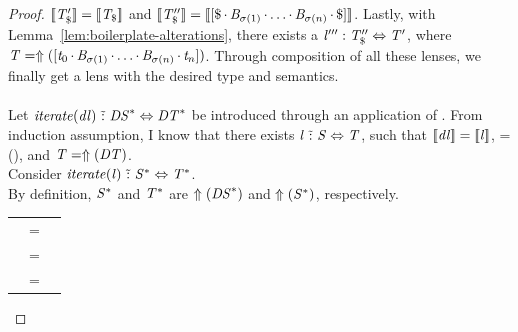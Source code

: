 \documentclass[acmsmall]{acmart}
\begin{document}
\begin{lemma}
\begin{proof}
    $[ \! [\mathit{T}_{\$}'] \! ]=[ \! [\mathit{T}_{\$}] \! ]$ and 
    $[ \! [\mathit{T}_{\$}''] \! ]=[ \! [[\$ \mkern-1mu\cdot\mkern-1mu  \mathit{B}_{\sigma(1)}  \mkern-1mu\cdot\mkern-1mu  \ldots  \mkern-1mu\cdot\mkern-1mu  \mathit{B}_{\sigma(n)}  \mkern-1mu\cdot\mkern-1mu  \$]] \! ]$.
    Lastly, with Lemma~\ref{lem:boilerplate-alterations}, there exists a
    $\mathit{l}''' : \mathit{T}_{\$}'' \Leftrightarrow \mathit{T}'$, where
    $\mathit{T} = \Uparrow([\mathit{t}_0 \mkern-1mu\cdot\mkern-1mu  \mathit{B}_{\sigma(1)}  \mkern-1mu\cdot\mkern-1mu  \ldots  \mkern-1mu\cdot\mkern-1mu  \mathit{B}_{\sigma(n)}  \mkern-1mu\cdot\mkern-1mu  \mathit{t}_n])$.
    Through composition of all these lenses, we finally get a lens with the desired type
    and semantics.\\
    \\
    Let $\mathit{\mathit{iterate}(\mathit{dl})} \,\,\tilde{:}\,\, {\mathit{DS}}^* \Leftrightarrow {\ensuremath{\mathit{DT}}}^*$
    be introduced through an application of \AtomLensRule{}.
    From induction assumption, I know that there exists $\mathit{l} \,\,\tilde{:}\,\, \mathit{S} \Leftrightarrow \mathit{T}$, such that
    $[ \! [\mathit{dl}] \! ]=[ \! [\mathit{l}] \! ]$,
    \Regex=\ToRegex(\DNFRegex), and
    $\mathit{T}=\Uparrow(\mathit{DT})$.\\
    Consider $\mathit{\mathit{iterate}(\mathit{l})} \,\,\tilde{:}\,\, {\mathit{S}}^* \Leftrightarrow {\ensuremath{\mathit{T}}}^*$.\\
    By definition, ${\mathit{S}}^*$ and ${\mathit{T}}^*$ are $\Uparrow({\mathit{DS}}^*)$
    and $\Uparrow({\mathit{S}}^*)$, respectively.

    \begin{tabular}{RcL}
      \SemanticsOf{\IterateLensOf{\Lens}} & = &
                                                \\
                                          & = &
                                                \\
                                          & = &
                                                \SemanticsOf{\IterateLensOf{\DNFLens}}
    \end{tabular}
  \end{proof}
\end{lemma}
\end{document}
